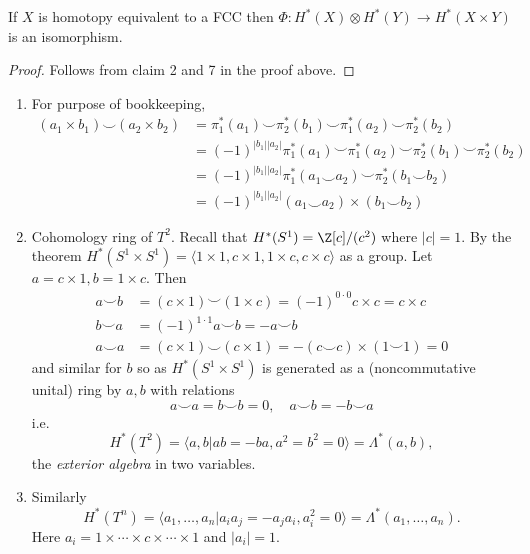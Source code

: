 \documentclass[a4paper]{article}
\newcommand*{\cp}{\smile} %
\begin{document}
\begin{theorem}
  If \(X\) is homotopy equivalent to a FCC then \(\Phi: H^*(X) \otimes H^*(Y) \to H^*(X \times Y)\) is an isomorphism.
\end{theorem}

\begin{proof}
  Follows from claim 2 and 7 in the proof above.
\end{proof}

\begin{eg}\leavevmode
  \begin{enumerate}
  \item For purpose of bookkeeping,
    \begin{align*}
      (a_1 \times b_1) \cp (a_2 \times b_2)
      &= \pi_1^*(a_1) \cp \pi_2^*(b_1) \cp \pi_1^*(a_2) \cp \pi_2^*(b_2) \\
      &= (-1)^{|b_1||a_2|} \pi_1^*(a_1) \cp \pi_1^*(a_2) \cp \pi_2^*(b_1) \cp \pi_2^*(b_2) \\
      &= (-1)^{|b_1||a_2|} \pi_1^*(a_1 \cp a_2) \cp \pi_2^*(b_1 \cp b_2) \\
      &= (-1)^{|b_1||a_2|} (a_1 \cp a_2) \times (b_1 \cp b_2)
    \end{align*}
  \item Cohomology ring of \(T^2\). Recall that \(H^*(S^1) = \Z[c]/(c^2)\) where \(|c| = 1\). By the theorem \(H^*(S^1 \times S^1) = \langle 1 \times 1, c \times 1, 1 \times c, c \times c \rangle\) as a group. Let \(a = c \times 1, b = 1 \times c\). Then
    \begin{align*}
      a \cp b &= (c \times 1) \cp (1 \times c) = (-1)^{0 \cdot 0} c \times c = c \times c \\
      b \cp a &= (-1)^{1 \cdot 1} a \cp b = - a \cp b \\
      a \cp a &= (c \times 1) \cp (c \times 1) = - (c \cp c) \times (1 \cp 1) = 0
    \end{align*}
    and similar for \(b\) so as \(H^*(S^1 \times S^1)\) is generated as a (noncommutative unital) ring by \(a, b\) with relations
    \[
      a \cp a = b \cp b = 0, \quad a \cp b = - b \cp a
    \]
    i.e.
    \[
      H^*(T^2) = \langle a, b | ab = -ba, a^2 = b^2 = 0 \rangle = \Lambda^*(a, b),
    \]
    the \emph{exterior algebra} in two variables.
  \item Similarly
    \[
      H^*(T^n) = \langle a_1, \dots, a_n | a_i a_j = -a_ja_i, a_i^2 = 0 \rangle = \Lambda^*(a_1, \dots, a_n).
    \]
    Here \(a_i = 1 \times \cdots \times c \times \cdots \times 1\) and \(|a_i| = 1\).

\end{enumerate}
\end{eg}
\end{document}
